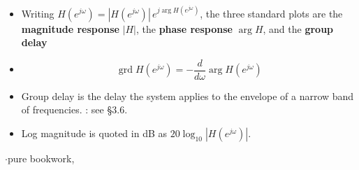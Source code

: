 \begin{itemize}
  \item Writing $H(e^{j\omega})=|H(e^{j\omega})|\,e^{j\arg H(e^{j\omega})}$, the three
        standard plots are the \textbf{magnitude response} $|H|$, the \textbf{phase
        response} $\arg H$, and the \textbf{group delay}
  \item[] \[ \operatorname{grd}H(e^{j\omega})=-\frac{d}{d\omega}\arg H(e^{j\omega}) \]
  \item Group delay is the delay the system applies to the envelope of a narrow band of
        frequencies. : see \S3.6.
  \item Log magnitude is quoted in dB as $20\log_{10}|H(e^{j\omega})|$.
\end{itemize}

\hr


{\color{sub}\footnotesize {} 
\gap$\cdot$\gap pure bookwork, }

